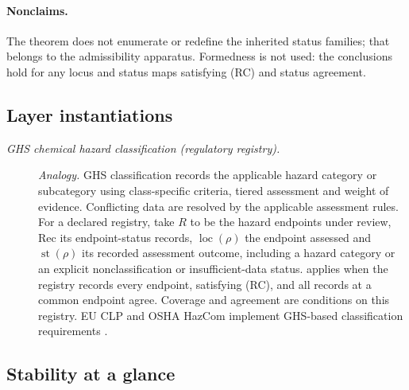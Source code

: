 \paragraph{Nonclaims.} The theorem does not
enumerate or redefine the inherited status families; that belongs to
the admissibility apparatus.  Formedness is not used: the conclusions
hold for any locus and status maps satisfying (RC) and status agreement.

\subsection*{Layer instantiations}\label{layer-inst:F9}

\begingroup\small
\begin{description}
\item[\emph{{GHS} chemical hazard classification (regulatory
registry).}] \textit{Analogy.}
GHS classification records the applicable hazard category or subcategory
using class-specific criteria, tiered assessment and weight of evidence.
Conflicting data are resolved by the applicable assessment rules. For a declared
registry, take \(R\) to be the hazard endpoints under review, \(\mathrm{Rec}\)
its endpoint-status records, \(\operatorname{loc}(\rho)\) the endpoint assessed and
\(\operatorname{st}(\rho)\) its recorded assessment outcome, including a hazard
category or an explicit nonclassification or insufficient-data status.
 applies when the registry records every endpoint, satisfying (RC),
and all records at a common endpoint agree. Coverage and agreement are
conditions on this registry. EU CLP and
OSHA HazCom implement GHS-based classification requirements
\citep{UN2025GHSRev11}.

\end{description}
\endgroup


\subsection*{Stability at a glance}\label{sec:stability:summary}

\FloatBarrier
